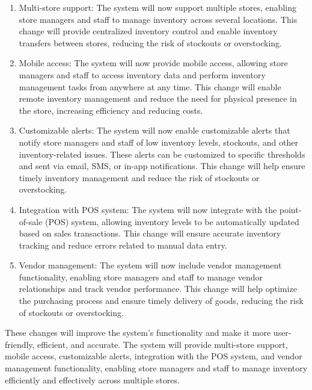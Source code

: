 \begin{enumerate}

    \item Multi-store support: The system will now support multiple stores, enabling store managers and staff to manage inventory across several locations. This change will provide centralized inventory control and enable inventory transfers between stores, reducing the risk of stockouts or overstocking.

    \item Mobile access: The system will now provide mobile access, allowing store managers and staff to access inventory data and perform inventory management tasks from anywhere at any time. This change will enable remote inventory management and reduce the need for physical presence in the store, increasing efficiency and reducing costs.

    \item Customizable alerts: The system will now enable customizable alerts that notify store managers and staff of low inventory levels, stockouts, and other inventory-related issues. These alerts can be customized to specific thresholds and sent via email, SMS, or in-app notifications. This change will help ensure timely inventory management and reduce the risk of stockouts or overstocking.

    \item Integration with POS system: The system will now integrate with the point-of-sale (POS) system, allowing inventory levels to be automatically updated based on sales transactions. This change will ensure accurate inventory tracking and reduce errors related to manual data entry.

    \item Vendor management: The system will now include vendor management functionality, enabling store managers and staff to manage vendor relationships and track vendor performance. This change will help optimize the purchasing process and ensure timely delivery of goods, reducing the risk of stockouts or overstocking.
    
\end{enumerate}
These changes will improve the system's functionality and make it more user-friendly, efficient, and accurate. The system will provide multi-store support, mobile access, customizable alerts, integration with the POS system, and vendor management functionality, enabling store managers and staff to manage inventory efficiently and effectively across multiple stores.

